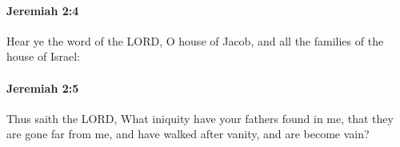 		\paragraph{Jeremiah 2:4} %
			\label{JEREMIAH-2-4}

			Hear ye the word of the LORD, O house of Jacob, and all the families of the house of Israel:


		\paragraph{Jeremiah 2:5} %
			\label{JEREMIAH-2-5}

			Thus saith the LORD, What iniquity have your fathers found in me, that they are gone far from me, and have walked after vanity, and are become vain?


